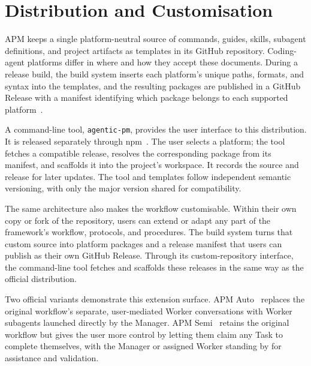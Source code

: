 \section{Distribution and Customisation}
\label{sec:framework-design-distribution-customisation}

APM keeps a single platform-neutral source of commands, guides, skills, subagent definitions, and project artifacts as templates in its GitHub repository. Coding-agent platforms differ in where and how they accept these documents. During a release build, the build system inserts each platform's unique paths, formats, and syntax into the templates, and the resulting packages are published in a GitHub Release with a manifest identifying which package belongs to each supported platform~\cite{chaidemenos2026apmrepo}.

A command-line tool, \texttt{agentic-pm}, provides the user interface to this distribution. It is released separately through npm~\cite{chaidemenos2026agenticpm101}. The user selects a platform; the tool fetches a compatible release, resolves the corresponding package from its manifest, and scaffolds it into the project's workspace. It records the source and release for later updates. The tool and templates follow independent semantic versioning, with only the major version shared for compatibility.

The same architecture also makes the workflow customisable. Within their own copy or fork of the repository, users can extend or adapt any part of the framework's workflow, protocols, and procedures. The build system turns that custom source into platform packages and a release manifest that users can publish as their own GitHub Release. Through its custom-repository interface, the command-line tool fetches and scaffolds these releases in the same way as the official distribution.

Two official variants demonstrate this extension surface. APM Auto~\cite{chaidemenos2026apmauto} replaces the original workflow's separate, user-mediated Worker conversations with Worker subagents launched directly by the Manager. APM Semi~\cite{chaidemenos2026apmsemi} retains the original workflow but gives the user more control by letting them claim any Task to complete themselves, with the Manager or assigned Worker standing by for assistance and validation.
